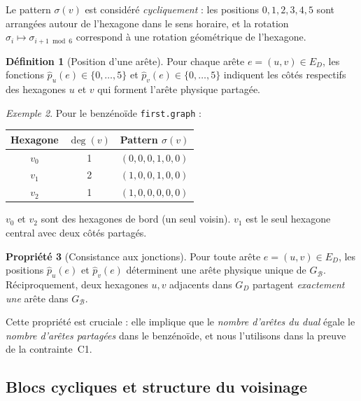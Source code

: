 \documentclass[12pt,a4paper]{article}
\theoremstyle{definition}
\newtheorem{definition}{D\'efinition}[section]
\newtheorem{propriete}[definition]{Propri\'et\'e}
\theoremstyle{remark}
\newtheorem{exemple}[definition]{Exemple}
\newcommand{\B}{\mathcal{B}}
\newcommand{\GD}{G_{\!D}}
\newcommand{\GB}{G_{\!\B}}
\newcommand{\ED}{E_{\!D}}
\newcommand{\degv}{\deg(v)}
\newcommand{\posIn}[2]{\hat{p}_{#1}(#2)}
\begin{document}
Le pattern $\sigma(v)$ est consid\'er\'e \emph{cycliquement} : les positions
$0, 1, 2, 3, 4, 5$ sont arrang\'ees autour de l'hexagone dans le sens
horaire, et la rotation $\sigma_i \mapsto \sigma_{i+1 \bmod 6}$ correspond
\`a une rotation g\'eom\'etrique de l'hexagone.

\begin{definition}[Position d'une ar\^ete]
Pour chaque ar\^ete $e = (u, v) \in \ED$, les fonctions
$\posIn{u}{e} \in \{0, \ldots, 5\}$ et $\posIn{v}{e} \in \{0, \ldots, 5\}$
indiquent les c\^ot\'es respectifs des hexagones $u$ et $v$ qui forment
l'ar\^ete physique partag\'ee.
\end{definition}

\begin{exemple}
Pour le benz\'eno\"ide \texttt{first.graph} :
\begin{center}
\renewcommand{\arraystretch}{1.2}
\begin{tabular}{ccl}
\toprule
Hexagone & $\degv$ & Pattern $\sigma(v)$ \\
\midrule
$v_0$ & 1 & $(0, 0, 0, 1, 0, 0)$ \\
$v_1$ & 2 & $(1, 0, 0, 1, 0, 0)$ \\
$v_2$ & 1 & $(1, 0, 0, 0, 0, 0)$ \\
\bottomrule
\end{tabular}
\end{center}
$v_0$ et $v_2$ sont des \og hexagones de bord \fg{} (un seul voisin).
$v_1$ est le seul hexagone central avec deux c\^ot\'es partag\'es.
\end{exemple}

\begin{propriete}[Consistance aux jonctions]
\label{prop:consistance}
Pour toute ar\^ete $e = (u, v) \in \ED$, les positions
$\posIn{u}{e}$ et $\posIn{v}{e}$ d\'eterminent une ar\^ete physique unique de
$\GB$. R\'eciproquement, deux hexagones $u, v$ adjacents dans $\GD$
partagent \emph{exactement une} ar\^ete dans $\GB$.
\end{propriete}

Cette propri\'et\'e est cruciale : elle implique que le \emph{nombre
d'ar\^etes du dual} \'egale le \emph{nombre d'ar\^etes partag\'ees}
dans le benz\'eno\"ide, et nous l'utilisons dans la preuve de la
contrainte~C1.

\subsection{Blocs cycliques et structure du voisinage}
\end{document}
